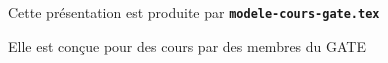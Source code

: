 
  \item Cette présentation est produite par \texttt{\textbf{modele-cours-gate.tex}}
  \item Elle est conçue pour des cours par des membres du GATE
